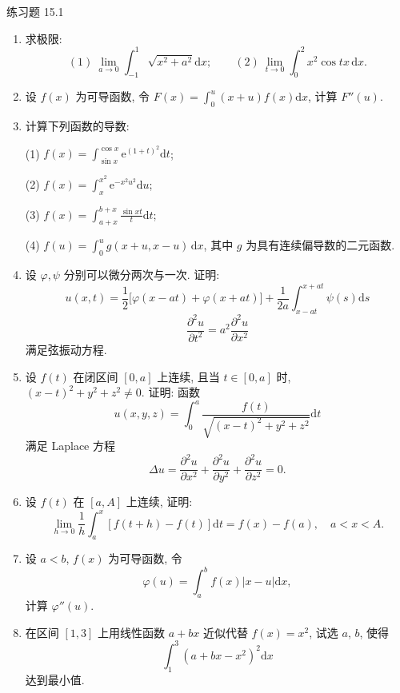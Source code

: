 \begin{exblock}{练习题 15.1}
\begin{enumerate}
  \item 求极限:
  \[
    (1)\ \lim_{a\to0}\int_{-1}^{1}\sqrt{x^{2}+a^{2}}\mathrm{d}x;\qquad
    (2)\ \lim_{t\to0}\int_{0}^{2}x^{2}\cos tx\,\mathrm{d}x.
\]
  \item 设 $f(x)$ 为可导函数, 令 $F(x)=\displaystyle\int_{0}^{u}(x+u)f(x)\mathrm{d}x$, 计算 $F''(u)$.
  \item 计算下列函数的导数:

  (1) $f(x)=\displaystyle\int_{\sin x}^{\cos x}\mathrm{e}^{(1+t)^{2}}\mathrm{d}t$;

  (2) $f(x)=\displaystyle\int_{x}^{x^{2}}\mathrm{e}^{-x^{2}u^{2}}\mathrm{d}u$;

  (3) $f(x)=\displaystyle\int_{a+x}^{b+x}\frac{\sin xt}{t}\mathrm{d}t$;

  (4) $f(u)=\displaystyle\int_{0}^{u}g(x+u,x-u)\,\mathrm{d}x$, 其中 $g$ 为具有连续偏导数的二元函数.
  \item 设 $\varphi,\psi$ 分别可以微分两次与一次. 证明:
  \[
    u(x,t)=\frac{1}{2}\big[\varphi(x-at)+\varphi(x+at)\big]+\frac{1}{2a}\int_{x-at}^{x+at}\psi(s)\mathrm{d}s
\]
  \[
    \frac{\partial^{2}u}{\partial t^{2}}=a^{2}\frac{\partial^{2}u}{\partial x^{2}}
\]
  满足弦振动方程.
  \item 设 $f(t)$ 在闭区间 $[0,a]$ 上连续, 且当 $t\in[0,a]$ 时, $(x-t)^{2}+y^{2}+z^{2}\neq0$. 证明: 函数
  \[
    u(x,y,z)=\int_{0}^{a}\frac{f(t)}{\sqrt{(x-t)^{2}+y^{2}+z^{2}}}\mathrm{d}t
\]
  满足 Laplace 方程
  \[
    \Delta u=\frac{\partial^{2}u}{\partial x^{2}}+\frac{\partial^{2}u}{\partial y^{2}}+\frac{\partial^{2}u}{\partial z^{2}}=0.
\]
  \item 设 $f(t)$ 在 $[a,A]$ 上连续, 证明:
  \[
    \lim_{h\to0}\frac{1}{h}\int_{a}^{x}[f(t+h)-f(t)]\mathrm{d}t=f(x)-f(a),\quad a<x<A.
\]
  \item 设 $a<b$, $f(x)$ 为可导函数, 令
  \[
    \varphi(u)=\int_{a}^{b}f(x)|x-u|\mathrm{d}x,
\]
  计算 $\varphi''(u)$.
  \item 在区间 $[1,3]$ 上用线性函数 $a+bx$ 近似代替 $f(x)=x^{2}$, 试选 $a$, $b$, 使得
  \[
    \int_{1}^{3}(a+bx-x^{2})^{2}\mathrm{d}x
\]
  达到最小值.
\end{enumerate}
\end{exblock}

